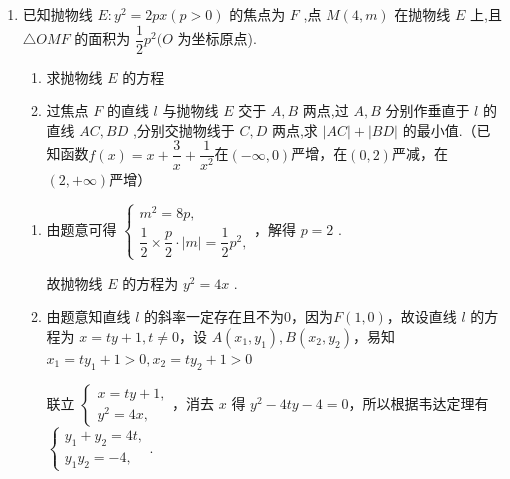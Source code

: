 \begin{enumerate}
\begin{enumerate}
\begin{jieda}
\begin{enumerate}
                    设切点为$(x_0, y_0)$，则该处切线为$100y_0y = 2(10x-9+10x_0-9)$，即$100y_0y = 20x+(20x_0-36)$，根据切线过原点可知$x_0 = \dfrac{9}{5}$，代入切线方程可知$y_0 = \pm \dfrac{3}{5}$，故切线为$y = \pm \dfrac{1}{3}x$，故最大值为$\dfrac{1}{3}$.
            \end{enumerate}
        \end{jieda}
        \item 已知抛物线 $E : {y}^{2} = {2px}\left( {p > 0}\right)$ 的焦点为 $F$ ,点 $M\left( {4,m}\right)$ 在抛物线 $E$ 上,且 $\bigtriangleup {OMF}$ 的面积为 $\dfrac{1}{2}{p}^{2}(O$ 为坐标原点).
        \begin{enumerate}
            \item 求抛物线 $E$ 的方程
            \item 过焦点 $F$ 的直线 $l$ 与抛物线 $E$ 交于 $A,B$ 两点,过 $A,B$ 分别作垂直于 $l$ 的直线 ${AC},{BD}$ ,分别交抛物线于 $C,D$ 两点,求 $\left| {AC}\right|  + \left| {BD}\right|$ 的最小值.（已知函数$f(x) = x+\dfrac{3}{x}+\dfrac{1}{x^2}$在$(-\infty, 0)$严增，在$(0, 2)$严减，在$(2, +\infty)$严增）
        \end{enumerate}
        \begin{jieda}
            \begin{enumerate}
                \item 由题意可得 $\left\{  \begin{array}{l} {m}^{2} = {8p}, \\  \dfrac{1}{2} \times  \dfrac{p}{2} \cdot  \left| m\right|  = \dfrac{1}{2}{p}^{2}, \end{array}\right.$，解得 $p = 2$ .
                
                故抛物线 $E$ 的方程为 ${y}^{2} = {4x}$ .
                \item 由题意知直线 $l$ 的斜率一定存在且不为0，因为$F\left( {1,0}\right)$，故设直线 $l$ 的方程为 $x = {ty} + 1,t \neq  0$，设 $A\left( {{x}_{1},{y}_{1}}\right) ,B\left( {{x}_{2},{y}_{2}}\right)$，易知 ${x}_{1} = t{y}_{1} + 1 > 0,{x}_{2} = t{y}_{2} + 1 > 0$ 
                
                联立 $\left\{  \begin{array}{l} x = {ty} + 1, \\  {y}^{2} = {4x}, \end{array}\right.$，消去 $x$ 得 ${y}^{2} - {4ty} - 4 = 0$，所以根据韦达定理有$\left\{  \begin{array}{l} {y}_{1} + {y}_{2} = {4t}, \\  {y}_{1}{y}_{2} =  - 4, \end{array}\right.$.
                

\end{enumerate}
\end{jieda}
\end{enumerate}
\end{enumerate}

